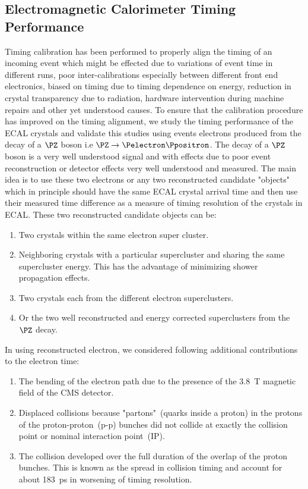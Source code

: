 \subsection{Electromagnetic Calorimeter Timing Performance}
Timing calibration has been performed to properly align the timing of an incoming event which might be effected due to variations of event time in different runs, poor inter-calibrations especially between different front end electronics, biased on timing due to timing dependence on energy, reduction in \pb crystal transparency due to radiation, hardware intervention during machine repairs and other yet understood causes. To ensure that the calibration procedure has improved on the timing alignment, we study the timing performance of the ECAL crystals and validate this studies using events electrons produced from the decay of a $\PZ$ boson  i.e $\PZ \rightarrow \Pelectron \Ppositron$.  The decay of a $\PZ$ boson is a very well understood signal and with effects due to poor event reconstruction or detector effects very well understood and measured. 
\newline
The main idea is to use these two electrons or any two reconstructed candidate "objects" which in principle should have the same ECAL crystal arrival time and then use their measured time difference as a measure of timing resolution of the \pb crystals in ECAL. These two reconstructed candidate objects can be:
\begin{enumerate}
\item Two crystals within the same electron super cluster.
\item Neighboring crystals with a particular supercluster and sharing the same supercluster energy. This has the advantage of minimizing shower propagation effects.
\item Two crystals each from the different electron superclusters.
\item Or the two well reconstructed and energy corrected superclusters from the $\PZ$ decay. 
\end{enumerate}

In using reconstructed electron, we considered following additional contributions to the electron time:
\begin{enumerate}
\item The bending of the electron path due to the presence of the 3.8~T magnetic field of the CMS detector.
\item  Displaced collisions because "partons"~(quarks inside a proton) in the protons of the proton-proton~(p-p) bunches did not collide at exactly the collision point or nominal interaction point~(IP).
\item The collision developed over the full duration of the overlap of the proton bunches. This is known as the spread in collision timing and account for about 183~ps in worsening of timing resolution.
\end{enumerate}

